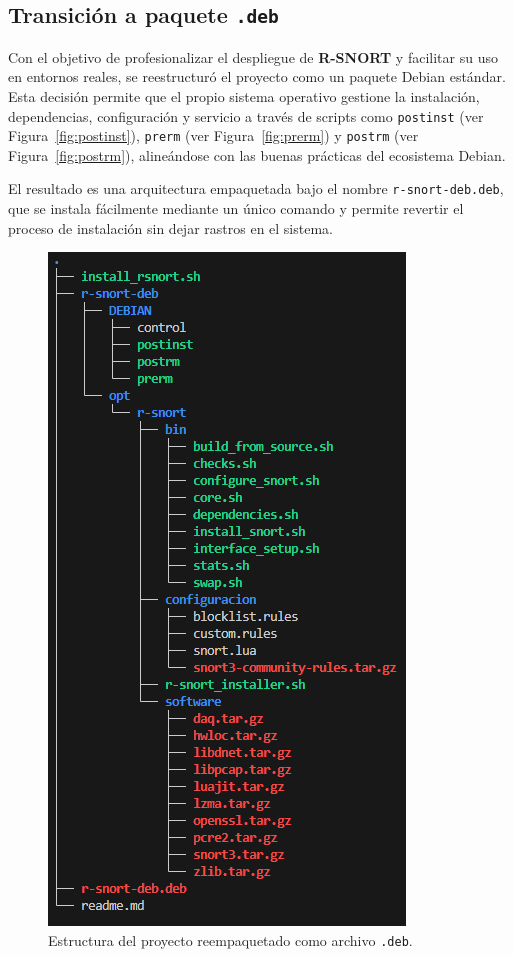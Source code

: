 \documentclass[12pt,a4paper]{report}
\begin{document}

\subsection{Transición a paquete \texttt{.deb}}

Con el objetivo de profesionalizar el despliegue de \textbf{R-SNORT} y facilitar su uso en entornos reales, se reestructuró el proyecto como un paquete Debian estándar. Esta decisión permite que el propio sistema operativo gestione la instalación, dependencias, configuración y servicio a través de scripts como \texttt{postinst} (ver Figura~\ref{fig:postinst}), \texttt{prerm} (ver Figura~\ref{fig:prerm}) y \texttt{postrm} (ver Figura~\ref{fig:postrm}), alineándose con las buenas prácticas del ecosistema Debian.
\newline

El resultado es una arquitectura empaquetada bajo el nombre \texttt{r-snort-deb.deb}, que se instala fácilmente mediante un único comando y permite revertir el proceso de instalación sin dejar rastros en el sistema.

\begin{figure}[H]
	\centering
	\includegraphics[scale=0.8]{script_automatico/13.png}
	\caption{Estructura del proyecto reempaquetado como archivo \texttt{.deb}.}
\end{figure}
\end{document}
